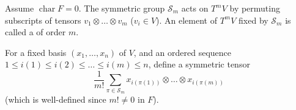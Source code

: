 Assume $\operatorname{char} F = 0$. The symmetric group $\mathcal{S}_m$ acts on $T^mV$ by permuting subscripts of tensors $v_1 \otimes \dots \otimes v_m$ ($v_i \in V$). An element of $T^mV$ fixed by $\mathcal{S}_m$ is called a  of order $m$.

For a fixed basis $(x_1, \dots, x_n)$ of $V$, and an ordered sequence $1 \leq i(1) \leq i(2) \leq \dots \leq i(m) \leq n$, define a symmetric tensor
$$
\frac{1}{m!} \sum_{\pi \in \mathcal{S}_m} x_{i(\pi(1))} \otimes \dots \otimes x_{i(\pi(m))}
$$
(which is well-defined since $m! \neq 0$ in $F$).

